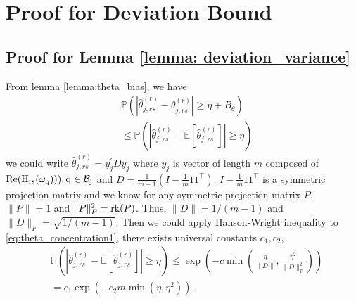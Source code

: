 \section{Proof for Deviation Bound}

\subsection{Proof for Lemma \ref{lemma: deviation_variance}}
From lemma \ref{lemma:theta_bias}, we have
\begin{equation}
\label{eq:theta_concentration1}
\begin{aligned}
&\mathbb{P}\left(|\hat{\theta}^{(r)}_{j,rs} - \theta^{(r)}_{j,rs}|\ge \eta +B_\theta \right)\\
&\le \mathbb{P}\left(|\hat{\theta}^{(r)}_{j,rs} - \mathbb{E}[\hat{\theta}^{(r)}_{j,rs}]|\ge \eta \right)
\end{aligned}
\end{equation}
we could write 
$\hat{\theta}^{(r)}_{j,rs} = y_j^\prime Dy_j$ where $y_j$ is vector of length $m$ composed of $\rm{Re}(H_{rs}(\omega_q))), q\in \mathcal{B}_j$ and $D = \frac{1}{m-1} (I-\frac{1}{m}11^\top)$. $I-\frac{1}{m}11^\top$ is a symmetric projection matrix and we know for any symmetric projection matrix $P$, $\|P\|=1$ and $\|P\|_F^2 =\mbox{rk}(P)$. Thus, $\|D\| = 1/(m-1)$ and $\|D\|_F = \sqrt{1/(m-1)}$. Then we could apply Hanson-Wright inequality \citep{rudelson2013hanson} to \eqref{eq:theta_concentration1}, there exists  universal constants $c_1, c_2$, 
\begin{equation}
\begin{aligned}
&\mathbb{P}\left(|\hat{\theta}^{(r)}_{j,rs} - \mathbb{E}[\hat{\theta}^{(r)}_{j,rs}]|\ge \eta \right) \le \exp\left(-c\min \left(\frac{\eta}{\|D\|}, \frac{\eta^2}{\|D\|_F^2}\right)\right)\\
& = c_1\exp(-c_2m\min\left(\eta, \eta^2\right)).
\end{aligned}
\end{equation}